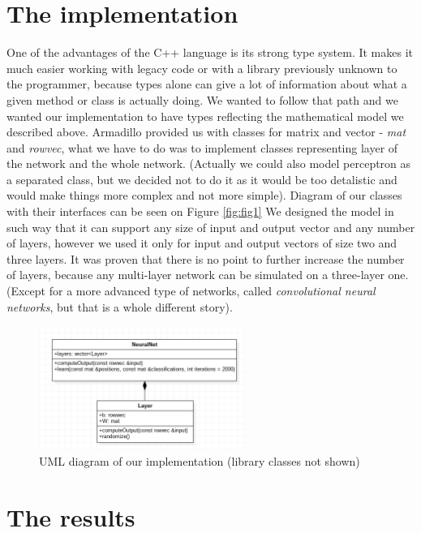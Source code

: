 \documentclass[3p,twocolumn]{elsarticle}
\begin{document}
\section{The implementation}

One of the advantages of the C++ language is its strong type system. It makes it much easier working with legacy code or with a library previously unknown to the programmer, because types alone can give a lot of information about what a given method or class is actually doing. We wanted to follow that path and we wanted our implementation to have types reflecting the mathematical model we described above. Armadillo provided us with classes for matrix and vector - \emph{mat} and \emph{rowvec}, what we have to do was to implement classes representing layer of the network and the whole network. (Actually we could also model perceptron as a separated class, but we decided not to do it as it would be too detalistic and would make things more complex and not more simple). Diagram of our classes with their interfaces can be seen on Figure \ref{fig:fig1} We designed the model in such way that it can support any size of input and output vector and any number of layers, however we used it only for input and output vectors of size two and three layers. It was proven that there is no point to further increase the number of layers, because any multi-layer network can be simulated on a three-layer one. (Except for a more advanced type of networks, called \emph{convolutional neural networks}, but that is a whole different story).

\begin{figure}[b]
	
\label{fig:fig3}
  \includegraphics[width=0.60\textwidth]{uml-diagram.png}
	\caption{UML diagram of our implementation (library classes not shown)}
	\label{fig3}
\end{figure}

\section{The results}
\end{document}
